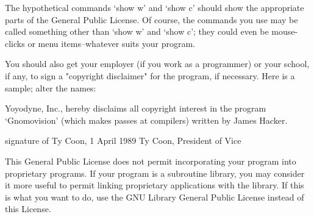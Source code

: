 The hypothetical commands `show w' and `show c' should show the appropriate parts of the General Public License. Of course, the commands you use may be called something other than `show w' and `show c'; they could even be mouse-clicks or menu items--whatever suits your program.

You should also get your employer (if you work as a programmer) or your school, if any, to sign a "copyright disclaimer" for the program, if necessary. Here is a sample; alter the names:

Yoyodyne, Inc., hereby disclaims all copyright interest in the program `Gnomovision' (which makes passes at compilers) written by James Hacker.

signature of Ty Coon, 1 April 1989
Ty Coon, President of Vice

This General Public License does not permit incorporating your program into proprietary programs. If your program is a subroutine library, you may consider it more useful to permit linking proprietary applications with the library. If this is what you want to do, use the GNU Library General Public License instead of this License.
